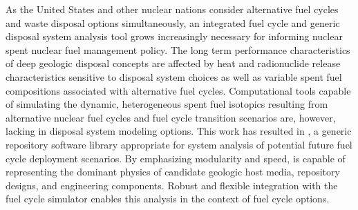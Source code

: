 As the United States and other nuclear nations consider alternative fuel cycles 
and waste disposal options simultaneously, an integrated fuel cycle and generic disposal system 
analysis tool grows increasingly necessary for informing nuclear spent nuclear 
fuel management policy. The long term performance characteristics of deep 
geologic disposal concepts are affected by heat and radionuclide release 
characteristics sensitive to disposal system choices as well as variable spent 
fuel compositions associated  with alternative fuel cycles.  Computational 
tools capable of simulating the dynamic, heterogeneous spent fuel isotopics 
resulting from alternative nuclear fuel cycles and fuel cycle transition 
scenarios are, however, 
lacking in disposal system modeling options.  This work has resulted in \Cyder, a 
generic repository software library appropriate for
system analysis of potential future fuel cycle deployment scenarios.  By emphasizing 
modularity and speed, \Cyder is capable of representing the dominant 
physics of candidate geologic host media, repository designs, and engineering components. 
Robust and flexible integration with the \Cyclus fuel cycle simulator
enables this analysis in the context of fuel cycle options.  

\glsresetall
